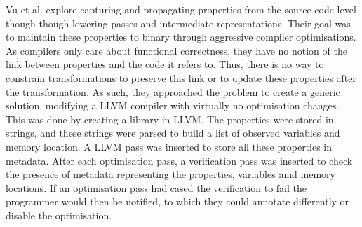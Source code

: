 Vu et al. \cite{vu2020secure} explore capturing and propagating properties from the source code level though though lowering passes and intermediate representations. Their goal was to maintain these properties to binary through aggressive compiler optimisations. As compilers only care about functional correctness, they have no notion of the link between properties and the code it refers to. Thus, there is no way to constrain transformations to preserve this link or to update these properties after the transformation. As such, they approached the problem to create a generic solution, modifying a LLVM compiler with virtually no optimisation changes. This was done by creating a library in LLVM. The properties were stored in strings, and these strings were parsed to build a list of observed variables and memory location. A LLVM pass was inserted to store all these properties in metadata. After each optimisation pass, a verification pass was inserted to check the presence of metadata representing the properties, variables amd memory locations. If an optimisation pass had cased the verification to fail the programmer would then be notified, to which they could annotate differently or disable the optimisation.

